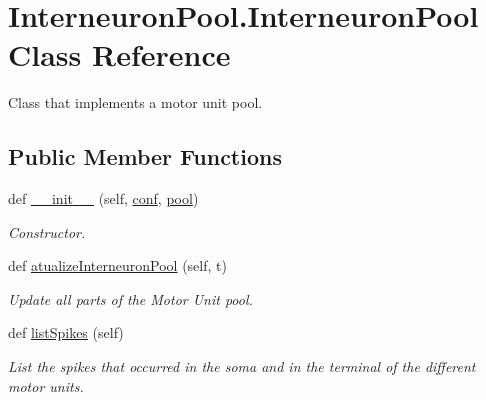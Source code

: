 \hypertarget{class_interneuron_pool_1_1_interneuron_pool}{}\section{Interneuron\+Pool.\+Interneuron\+Pool Class Reference}
\label{class_interneuron_pool_1_1_interneuron_pool}


Class that implements a motor unit pool.  


\subsection*{Public Member Functions}
\begin{DoxyCompactItemize}
\item 
def \hyperlink{class_interneuron_pool_1_1_interneuron_pool_a5de3519e16062bee1550d1ce8190fce5}{\+\_\+\+\_\+init\+\_\+\+\_\+} (self, \hyperlink{class_interneuron_pool_1_1_interneuron_pool_a2418c4def3edaa2e5cd7514df52499d5}{conf}, \hyperlink{class_interneuron_pool_1_1_interneuron_pool_a08c57ed586708a120335dfe72c2d6460}{pool})
\begin{DoxyCompactList}\small\item\em Constructor. \end{DoxyCompactList}\item 
def \hyperlink{class_interneuron_pool_1_1_interneuron_pool_a2beb714ccc631317a8a7854d42c6cf01}{atualize\+Interneuron\+Pool} (self, t)
\begin{DoxyCompactList}\small\item\em Update all parts of the Motor Unit pool. \end{DoxyCompactList}\item 
def \hyperlink{class_interneuron_pool_1_1_interneuron_pool_a510f7df22d1f5bd07cefa04455f4a189}{list\+Spikes} (self)
\begin{DoxyCompactList}\small\item\em List the spikes that occurred in the soma and in the terminal of the different motor units. \end{DoxyCompactList}\end{DoxyCompactItemize}
